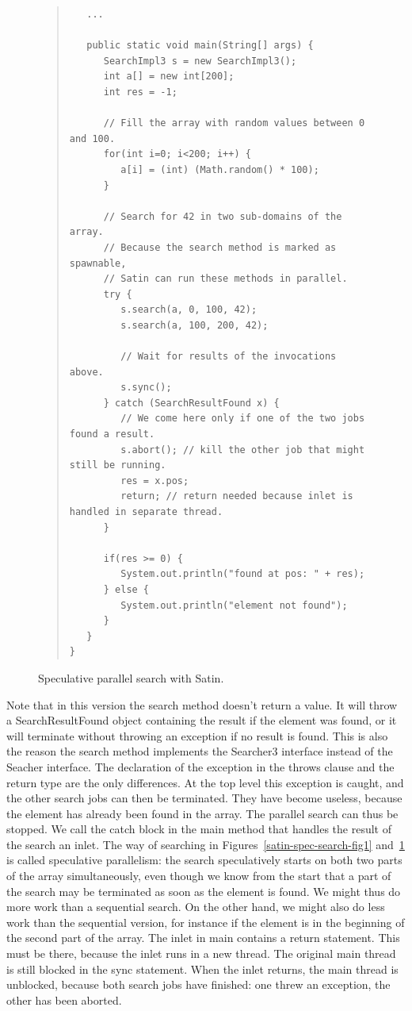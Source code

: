 \documentclass[10pt]{article}
\begin{document}
\begin{figure}[t!]
\small{
\begin{quote}
\begin{verbatim}
   ...

   public static void main(String[] args) {
      SearchImpl3 s = new SearchImpl3();
      int a[] = new int[200];
      int res = -1;

      // Fill the array with random values between 0 and 100.
      for(int i=0; i<200; i++) {
         a[i] = (int) (Math.random() * 100);
      }

      // Search for 42 in two sub-domains of the array.
      // Because the search method is marked as spawnable,
      // Satin can run these methods in parallel.
      try {
         s.search(a, 0, 100, 42);
         s.search(a, 100, 200, 42);

         // Wait for results of the invocations above.
         s.sync();
      } catch (SearchResultFound x) {
         // We come here only if one of the two jobs found a result.
         s.abort(); // kill the other job that might still be running.
         res = x.pos;
         return; // return needed because inlet is handled in separate thread.
      }

      if(res >= 0) {
         System.out.println("found at pos: " + res);
      } else {
         System.out.println("element not found");
      }
   }
}
\end{verbatim}
\end{quote}
}
\caption{Speculative parallel search with Satin.}
\label{satin-spec-search-fig2}
\end{figure}

Note that in this version the search method doesn't return a value. It
will throw a SearchResultFound object containing the result if the
element was found, or it will terminate without throwing an exception
if no result is found. This is also the reason the search method
implements the Searcher3 interface instead of the Seacher
interface. The declaration of the exception in the throws clause and
the return type are the only differences.  At the top level this
exception is caught, and the other search jobs can then be
terminated. They have become useless, because the element has already
been found in the array. The parallel search can thus be stopped. We
call the catch block in the main method that handles the result of the
search an inlet.  The way of searching in Figures~\ref{satin-spec-search-fig1} and~\ref{satin-spec-search-fig2} is called
speculative parallelism: the search speculatively starts on both two
parts of the array simultaneously, even though we know from the start
that a part of the search may be terminated as soon as the element is
found. We might thus do more work than a sequential search. On the
other hand, we might also do less work than the sequential version,
for instance if the element is in the beginning of the second part of
the array.  The inlet in main contains a return statement. This must
be there, because the inlet runs in a new thread. The original main
thread is still blocked in the sync statement. When the inlet returns,
the main thread is unblocked, because both search jobs have finished:
one threw an exception, the other has been aborted.  
\end{document}
